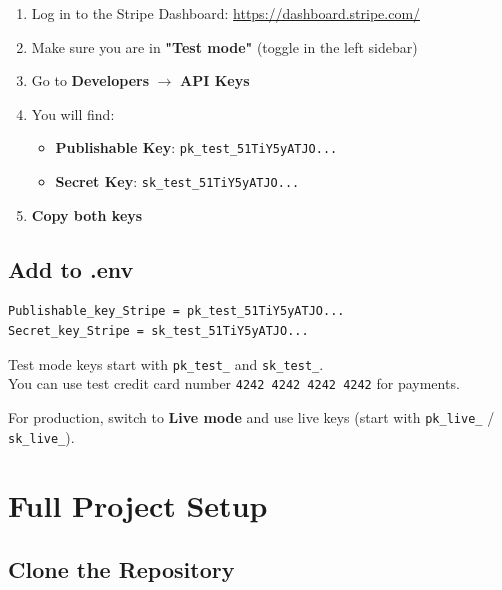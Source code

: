 \documentclass[12pt,a4paper]{article}
\begin{document}
\begin{enumerate}[leftmargin=*,itemsep=0.5em]
    \item Log in to the Stripe Dashboard: \url{https://dashboard.stripe.com/}
    \item Make sure you are in \textbf{"Test mode"} (toggle in the left sidebar)
    \item Go to \textbf{Developers} $\rightarrow$ \textbf{API Keys}
    \item You will find:
    \begin{itemize}
        \item \textbf{Publishable Key}: \texttt{pk\_test\_51TiY5yATJO...}
        \item \textbf{Secret Key}: \texttt{sk\_test\_51TiY5yATJO...}
    \end{itemize}
    \item \textbf{Copy both keys}
\end{enumerate}

\subsection{Add to .env}

\begin{lstlisting}[caption=Stripe configuration in config/.env]
Publishable_key_Stripe = pk_test_51TiY5yATJO...
Secret_key_Stripe = sk_test_51TiY5yATJO...
\end{lstlisting}

\begin{tcolorbox}[colback=green!5!white,colframe=successgreen,title= Test Mode]
    Test mode keys start with \texttt{pk\_test\_} and \texttt{sk\_test\_}.\\
    You can use test credit card number \texttt{4242 4242 4242 4242} for payments.
    
    For production, switch to \textbf{Live mode} and use live keys (start with \texttt{pk\_live\_} / \texttt{sk\_live\_}).
\end{tcolorbox}

\newpage

\section{Full Project Setup}

\subsection{Clone the Repository}
\end{document}
